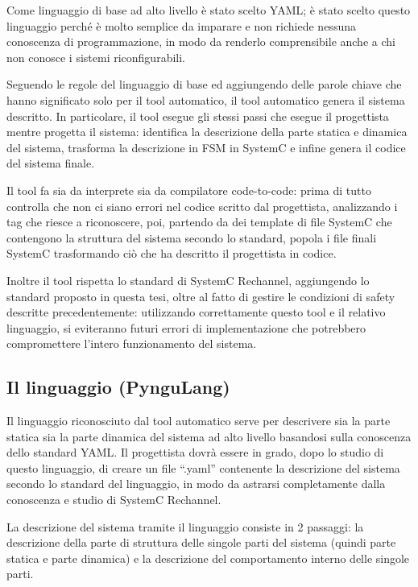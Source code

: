 \documentclass[a4paper,titlepage]{book}
\begin{document}
Come linguaggio di base ad alto livello è stato scelto YAML; è stato scelto questo linguaggio perché è molto semplice da imparare e non richiede nessuna conoscenza di programmazione, in modo da renderlo comprensibile anche a chi non conosce i sistemi riconfigurabili.

Seguendo le regole del linguaggio di base ed aggiungendo delle parole chiave che hanno significato solo per il tool automatico, il tool automatico genera il sistema descritto. In particolare, il tool esegue gli stessi passi che esegue il progettista mentre progetta il sistema: identifica la descrizione della parte statica e dinamica del sistema, trasforma la descrizione in FSM in SystemC e infine genera il codice del sistema finale.

Il tool fa sia da interprete sia da compilatore code-to-code: prima di tutto controlla che non ci siano errori nel codice scritto dal progettista, analizzando i tag che riesce a riconoscere, poi, partendo da dei template di file SystemC che contengono la struttura del sistema secondo lo standard, popola i file finali SystemC trasformando ciò che ha descritto il progettista in codice.

Inoltre il tool rispetta lo standard di SystemC Rechannel, aggiungendo lo standard proposto in questa tesi, oltre al fatto di gestire le condizioni di safety descritte precedentemente: utilizzando correttamente questo tool e il relativo linguaggio, si eviteranno futuri errori di implementazione che potrebbero compromettere l'intero funzionamento del sistema.

\subsection{Il linguaggio (PynguLang)}

Il linguaggio riconosciuto dal tool automatico serve per descrivere sia la parte statica sia la parte dinamica del sistema ad alto livello basandosi sulla conoscenza dello standard YAML. Il progettista dovrà essere in grado, dopo lo studio di questo linguaggio, di creare un file ``.yaml'' contenente la descrizione del sistema secondo lo standard del linguaggio, in modo da astrarsi completamente dalla conoscenza e studio di SystemC Rechannel.

La descrizione del sistema tramite il linguaggio  consiste in 2 passaggi: la descrizione della parte di struttura delle singole parti del sistema (quindi parte statica e parte dinamica) e la descrizione del comportamento interno delle singole parti.
\end{document}
